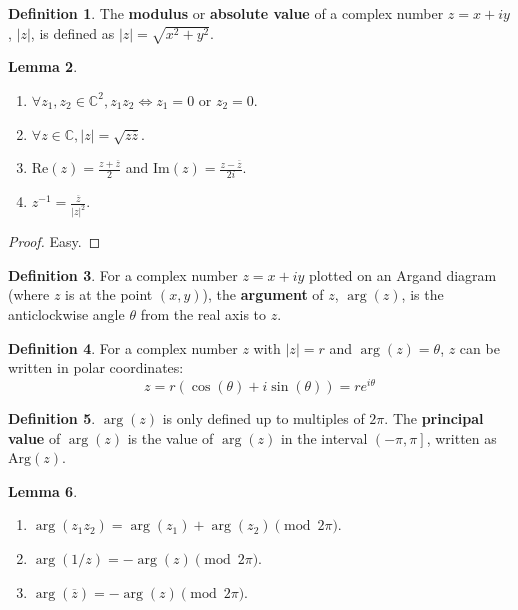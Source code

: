 \documentclass[12pt,a4paper]{article}
\theoremstyle{definition}
\newtheorem{definition}{Definition}[subsection]
\newtheorem{lemma}[definition]{Lemma}
\begin{document}
\begin{definition}
	The \textbf{modulus} or \textbf{absolute value} of a complex number $z = x + iy$, $|z|$, is defined as $|z| = \sqrt{x^2 + y^2}$.
\end{definition}

\begin{lemma}
	\hfill
	\begin{enumerate}
		\item $\forall z_1, z_2 \in \mathbb{C}^2, z_1 z_2 \Longleftrightarrow z_1 = 0 \text{ or } z_2 = 0$.
		\item $\forall z \in \mathbb{C}, |z| = \sqrt{z \overline{z}}$.
		\item $\text{Re}(z) = \frac{z + \overline{z}}{2}$ and $\text{Im}(z) = \frac{z - \overline{z}}{2i}$.
		\item $z^{-1} = \frac{\overline{z}}{|z|^2}$.
	\end{enumerate}
\end{lemma}

\begin{proof}
	Easy.
\end{proof}

\begin{definition}
	For a complex number $z = x + iy$ plotted on an Argand diagram (where $z$ is at the point $(x, y)$), the \textbf{argument} of $z$, $\arg(z)$, is the anticlockwise angle $\theta$ from the real axis to $z$.
\end{definition}

\begin{definition}
	For a complex number $z$ with $|z| = r$ and $\arg(z) = \theta$, $z$ can be written in polar coordinates:
	\[
		z = r(\cos(\theta) + i \sin(\theta)) = r e^{i \theta}
	\]
\end{definition}

\begin{definition}
	$\arg(z)$ is only defined up to multiples of $2 \pi$. The \textbf{principal value} of $\arg(z)$ is the value of $\arg(z)$ in the interval $\left(-\pi, \pi \right]$, written as $\text{Arg}(z)$.
\end{definition}

\begin{lemma}
	\hfill
	\begin{enumerate}
		\item $\arg(z_1 z_2) = \arg(z_1) + \arg(z_2) \pmod{2 \pi}$.
		\item $\arg(1 / z) = -\arg(z) \pmod{2 \pi}$.
		\item $\arg(\overline{z}) = -\arg(z) \pmod{2 \pi}$.
	\end{enumerate}
\end{lemma}
\end{document}
